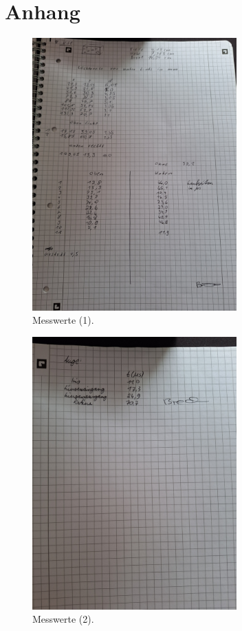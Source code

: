 \section{Anhang}
\label{sec:Anhang}

\begin{figure}[H]
    \centering
        \centering
        \includegraphics[width=0.7\textwidth, angle=-90]{Bilder/mw1.jpg}
        \caption{Messwerte (1).}
    \hfill
\end{figure}
\begin{figure}[H]
    \centering
        \centering
        \includegraphics[width=0.7\textwidth, angle=-90]{Bilder/mw2.jpg}
        \caption{Messwerte (2).}
    \hfill
\end{figure}